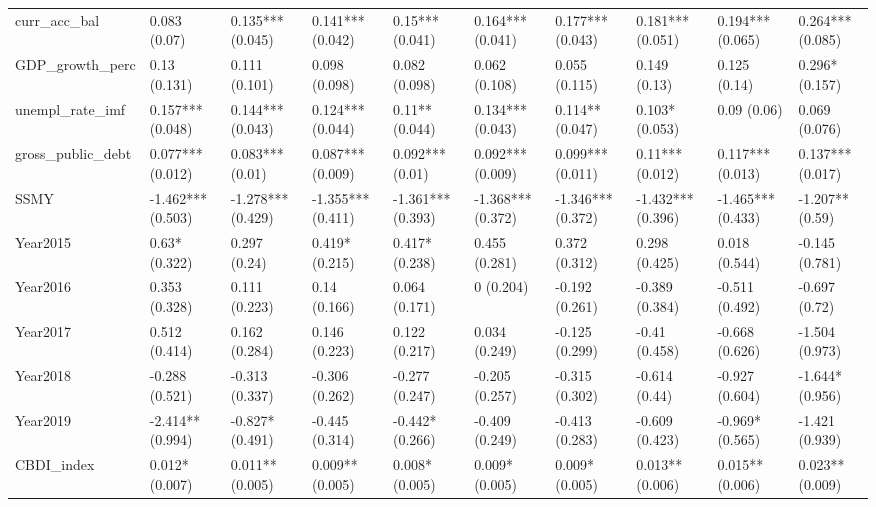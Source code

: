 \begin{table}[ht]
\begin{tabular}{llllllllll}
  curr\_acc\_bal & 0.083 (0.07) & 0.135*** (0.045) & 0.141*** (0.042) & 0.15*** (0.041) & 0.164*** (0.041) & 0.177*** (0.043) & 0.181*** (0.051) & 0.194*** (0.065) & 0.264*** (0.085) \\ 
  GDP\_growth\_perc & 0.13 (0.131) & 0.111 (0.101) & 0.098 (0.098) & 0.082 (0.098) & 0.062 (0.108) & 0.055 (0.115) & 0.149 (0.13) & 0.125 (0.14) & 0.296* (0.157) \\ 
  unempl\_rate\_imf & 0.157*** (0.048) & 0.144*** (0.043) & 0.124*** (0.044) & 0.11** (0.044) & 0.134*** (0.043) & 0.114** (0.047) & 0.103* (0.053) & 0.09 (0.06) & 0.069 (0.076) \\ 
  gross\_public\_debt & 0.077*** (0.012) & 0.083*** (0.01) & 0.087*** (0.009) & 0.092*** (0.01) & 0.092*** (0.009) & 0.099*** (0.011) & 0.11*** (0.012) & 0.117*** (0.013) & 0.137*** (0.017) \\ 
  SSMY & -1.462*** (0.503) & -1.278*** (0.429) & -1.355*** (0.411) & -1.361*** (0.393) & -1.368*** (0.372) & -1.346*** (0.372) & -1.432*** (0.396) & -1.465*** (0.433) & -1.207** (0.59) \\ 
  Year2015 & 0.63* (0.322) & 0.297 (0.24) & 0.419* (0.215) & 0.417* (0.238) & 0.455 (0.281) & 0.372 (0.312) & 0.298 (0.425) & 0.018 (0.544) & -0.145 (0.781) \\ 
  Year2016 & 0.353 (0.328) & 0.111 (0.223) & 0.14 (0.166) & 0.064 (0.171) & 0 (0.204) & -0.192 (0.261) & -0.389 (0.384) & -0.511 (0.492) & -0.697 (0.72) \\ 
  Year2017 & 0.512 (0.414) & 0.162 (0.284) & 0.146 (0.223) & 0.122 (0.217) & 0.034 (0.249) & -0.125 (0.299) & -0.41 (0.458) & -0.668 (0.626) & -1.504 (0.973) \\ 
  Year2018 & -0.288 (0.521) & -0.313 (0.337) & -0.306 (0.262) & -0.277 (0.247) & -0.205 (0.257) & -0.315 (0.302) & -0.614 (0.44) & -0.927 (0.604) & -1.644* (0.956) \\ 
  Year2019 & -2.414** (0.994) & -0.827* (0.491) & -0.445 (0.314) & -0.442* (0.266) & -0.409 (0.249) & -0.413 (0.283) & -0.609 (0.423) & -0.969* (0.565) & -1.421 (0.939) \\ 
  CBDI\_index & 0.012* (0.007) & 0.011** (0.005) & 0.009** (0.005) & 0.008* (0.005) & 0.009* (0.005) & 0.009* (0.005) & 0.013** (0.006) & 0.015** (0.006) & 0.023** (0.009) \\ 
   \bottomrule
\end{tabular}
\endgroup
\end{table}
